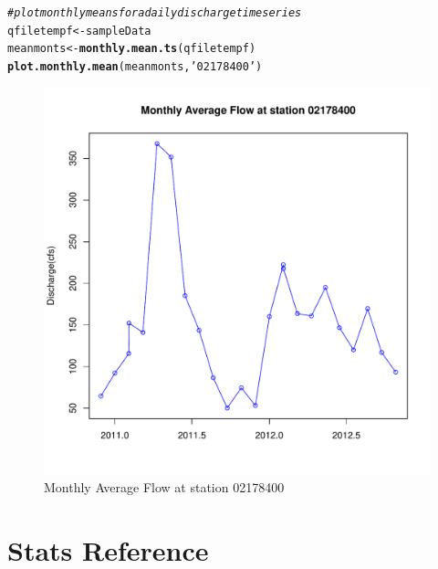 \documentclass[a4paper,11pt]{article}\usepackage[]{graphicx}\usepackage[]{color}
\makeatletter
\def\maxwidth{ %
  \ifdim\Gin@nat@width>\linewidth
    \linewidth
  \else
    \Gin@nat@width
  \fi
}
\newcommand{\hlstr}[1]{\textcolor[rgb]{0.192,0.494,0.8}{#1}}%
\newcommand{\hlcom}[1]{\textcolor[rgb]{0.678,0.584,0.686}{\textit{#1}}}%
\newcommand{\hlstd}[1]{\textcolor[rgb]{0.345,0.345,0.345}{#1}}%
\newcommand{\hlkwb}[1]{\textcolor[rgb]{0.69,0.353,0.396}{#1}}%
\newcommand{\hlkwd}[1]{\textcolor[rgb]{0.737,0.353,0.396}{\textbf{#1}}}%
\newenvironment{kframe}{%
 \def\at@end@of@kframe{}%
 \ifinner\ifhmode%
  \def\at@end@of@kframe{\end{minipage}}%
  \begin{minipage}{\columnwidth}%
 \fi\fi%
 \def\FrameCommand##1{\hskip\@totalleftmargin \hskip-\fboxsep
 \colorbox{shadecolor}{##1}\hskip-\fboxsep
     \hskip-\linewidth \hskip-\@totalleftmargin \hskip\columnwidth}%
 \MakeFramed {\advance\hsize-\width
   \@totalleftmargin\z@ \linewidth\hsize
   \@setminipage}}%
 {\par\unskip\endMakeFramed%
 \at@end@of@kframe}
\newenvironment{knitrout}{}{} %
\makeatother
\begin{document}
\begin{knitrout}
\color{fgcolor}\begin{kframe}
\begin{alltt}
\hlcom{# plot monthly means for a daily discharge timeseries}
\hlstd{qfiletempf}\hlkwb{<-}\hlstd{sampleData}
\hlstd{meanmonts}\hlkwb{<-}\hlkwd{monthly.mean.ts}\hlstd{(qfiletempf)}
\hlkwd{plot.monthly.mean}\hlstd{(meanmonts,}\hlstr{'02178400'}\hlstd{)}
\end{alltt}
\end{kframe}\begin{figure}[]

\includegraphics[width=\maxwidth]{figure/plotMonthlyMeans} \caption[Monthly Average Flow at station 02178400]{Monthly Average Flow at station 02178400\label{fig:plotMonthlyMeans}}
\end{figure}


\end{knitrout}


\FloatBarrier

\section{Stats Reference}
\label{sec:reference}
\end{document}

